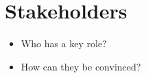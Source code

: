 \section{Stakeholders}
\label{sec:Stakeholders}

\begin{itemize}
    \item Who has a key role?
    \item How can they be convinced?
\end{itemize}